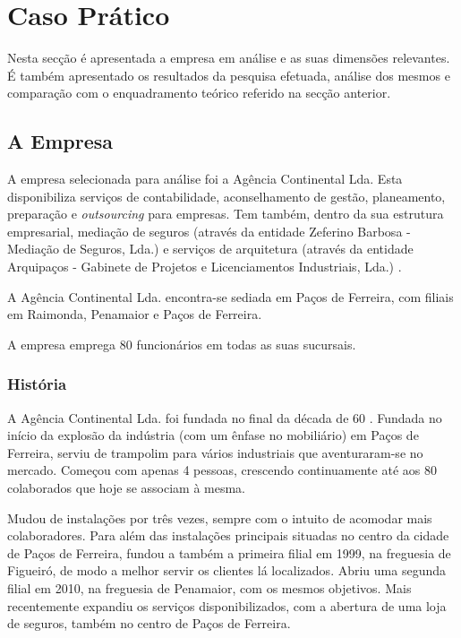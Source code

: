 
\section{Caso Prático}

Nesta secção é apresentada a empresa em análise e as suas dimensões relevantes. É também apresentado os resultados da pesquisa efetuada, análise dos mesmos e comparação com o enquadramento teórico referido na secção anterior.

\subsection{A Empresa}

A empresa selecionada para análise foi a Agência Continental Lda. Esta disponibiliza serviços de contabilidade, aconselhamento de gestão, planeamento, preparação e \textit{outsourcing} para empresas. Tem também, dentro da sua estrutura empresarial, mediação de seguros (através da entidade Zeferino Barbosa - Mediação de Seguros, Lda.) e serviços de arquitetura (através da entidade Arquipaços - Gabinete de Projetos e Licenciamentos Industriais, Lda.) \parencite{agenciacontinental}.

A Agência Continental Lda. encontra-se sediada em Paços de Ferreira, com filiais em Raimonda, Penamaior e Paços de Ferreira.

A empresa emprega 80 funcionários em todas as suas sucursais.

\subsubsection{História}

A Agência Continental Lda. foi fundada no final da década de 60 \parencite{agenciacontinental}. Fundada no início da explosão da indústria (com um ênfase no mobiliário) em Paços de Ferreira, serviu de trampolim para vários industriais que aventuraram-se no mercado. Começou com apenas 4 pessoas, crescendo continuamente até aos 80 colaborados que hoje se associam à mesma.

Mudou de instalações por três vezes, sempre com o intuito de acomodar mais colaboradores. Para além das instalações principais situadas no centro da cidade de Paços de Ferreira, fundou a também a primeira filial em 1999, na freguesia de Figueiró, de modo a melhor servir os clientes lá localizados. Abriu uma segunda filial em 2010, na freguesia de Penamaior, com os mesmos objetivos. Mais recentemente expandiu os serviços disponibilizados, com a abertura de uma loja de seguros, também no centro de Paços de Ferreira.

